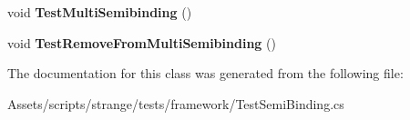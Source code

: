 \begin{DoxyCompactItemize}
\item 
\hypertarget{classstrange_1_1unittests_1_1_test_semi_binding_a4ba88dc951ab9cfb250128195dfb85bf}{void {\bfseries Test\-Multi\-Semibinding} ()}\label{classstrange_1_1unittests_1_1_test_semi_binding_a4ba88dc951ab9cfb250128195dfb85bf}

\item 
\hypertarget{classstrange_1_1unittests_1_1_test_semi_binding_a6d7ef526587771ee5093876dbbe9d372}{void {\bfseries Test\-Remove\-From\-Multi\-Semibinding} ()}\label{classstrange_1_1unittests_1_1_test_semi_binding_a6d7ef526587771ee5093876dbbe9d372}

\end{DoxyCompactItemize}


The documentation for this class was generated from the following file\-:\begin{DoxyCompactItemize}
\item 
Assets/scripts/strange/tests/framework/Test\-Semi\-Binding.\-cs\end{DoxyCompactItemize}
